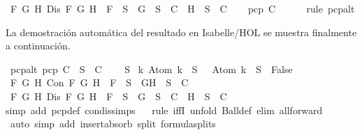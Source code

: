 \begin{isabellebody}
{\isasymand}\ {\isacharparenleft}{\isasymforall}F\ G\ H{\isachardot}\ Dis\ F\ G\ H\ {\isasymlongrightarrow}\ F\ {\isasymin}\ S\ {\isasymlongrightarrow}\ {\isacharbraceleft}G{\isacharbraceright}\ {\isasymunion}\ S\ {\isasymin}\ C\ {\isasymor}\ {\isacharbraceleft}H{\isacharbraceright}\ {\isasymunion}\ S\ {\isasymin}\ C{\isacharparenright}{\isachardoublequoteclose}\isanewline
\ \ \isamarkupfalse%
\ {\isachardoublequoteopen}pcp\ C{\isachardoublequoteclose}\isanewline
\ \ \ \ \isamarkupfalse%
\ {\isacharparenleft}rule\ pcp{\isacharunderscore}alt{}{\isacharparenright}\isanewline
{}\isamarkupfalse%
%
\endisatagproof
{\isafoldproof}%
%
\isadelimproof
%
\endisadelimproof
%
\begin{isamarkuptext}%
La demostración automática del resultado en Isabelle/HOL se muestra finalmente a 
  continuación.%
\end{isamarkuptext}\isamarkuptrue%
\isamarkupfalse%
\ pcp{\isacharunderscore}alt{\isacharcolon}\ {\isachardoublequoteopen}pcp\ C\ {\isacharequal}\ {\isacharparenleft}{\isasymforall}S\ {\isasymin}\ C{\isachardot}\isanewline
\ \ {\isasymbottom}\ {\isasymnotin}\ S\isanewline
{\isasymand}\ {\isacharparenleft}{\isasymforall}k{\isachardot}\ Atom\ k\ {\isasymin}\ S\ {\isasymlongrightarrow}\ \isactrlbold {\isasymnot}\ {\isacharparenleft}Atom\ k{\isacharparenright}\ {\isasymin}\ S\ {\isasymlongrightarrow}\ False{\isacharparenright}\isanewline
{\isasymand}\ {\isacharparenleft}{\isasymforall}F\ G\ H{\isachardot}\ Con\ F\ G\ H\ {\isasymlongrightarrow}\ F\ {\isasymin}\ S\ {\isasymlongrightarrow}\ {\isacharbraceleft}G{\isacharcomma}H{\isacharbraceright}\ {\isasymunion}\ S\ {\isasymin}\ C{\isacharparenright}\isanewline
{\isasymand}\ {\isacharparenleft}{\isasymforall}F\ G\ H{\isachardot}\ Dis\ F\ G\ H\ {\isasymlongrightarrow}\ F\ {\isasymin}\ S\ {\isasymlongrightarrow}\ {\isacharbraceleft}G{\isacharbraceright}\ {\isasymunion}\ S\ {\isasymin}\ C\ {\isasymor}\ {\isacharbraceleft}H{\isacharbraceright}\ {\isasymunion}\ S\ {\isasymin}\ C{\isacharparenright}{\isacharparenright}{\isachardoublequoteclose}\isanewline
%
\isadelimproof
\ \ %
\endisadelimproof
%
\isatagproof
{}\isamarkupfalse%
{\isacharparenleft}simp\ add{\isacharcolon}\ pcp{\isacharunderscore}def\ con{\isacharunderscore}dis{\isacharunderscore}simps{\isacharparenright}\isanewline
\ \ \isamarkupfalse%
{\isacharparenleft}rule\ iffI{\isacharsemicolon}\ unfold\ Ball{\isacharunderscore}def{\isacharsemicolon}\ elim\ all{\isacharunderscore}forward{\isacharparenright}\isanewline
\ \ \isamarkupfalse%
\ {\isacharparenleft}auto\ simp\ add{\isacharcolon}\ insert{\isacharunderscore}absorb\ split{\isacharcolon}\ formula{\isachardot}splits{\isacharparenright}\isanewline
%
\endisatagproof
{\isafoldproof}%
%
\isadelimproof
%
\endisadelimproof
%
\isadelimtheory
%
\endisadelimtheory
%
\isatagtheory
%
\endisatagtheory
{\isafoldtheory}%
%
\isadelimtheory
%
\endisadelimtheory
%
\end{isabellebody}%
